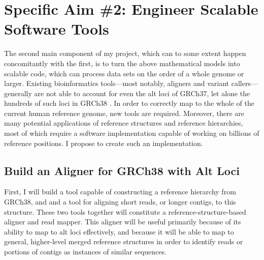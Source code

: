 \documentclass[11pt,proposal]{ucthesis}
\begin{document}
        
        
\section{Specific Aim \#2: Engineer Scalable Software Tools}
\label{sec:aim2}

The second main component of my project, which can to some extent happen concomitantly with the first, is to turn the above mathematical models into scalable code, which can process data sets on the order of a whole genome or larger. Existing bioinformatics tools---most notably, aligners and variant callers---generally are not able to account for even the alt loci of GRCh37, let alone the hundreds of such loci in GRCh38 \cite{church2014story}. In order to correctly map to the whole of the current human reference genome, new tools are required. Moreover, there are many potential applications of reference structures and reference hierarchies, most of which require a software implementation capable of working on billions of reference positions. I propose to create such an implementation.

\subsection{Build an Aligner for GRCh38 with Alt Loci}
\label{subsec:aim2aligner}

First, I will build a tool capable of constructing a reference hierarchy from GRCh38, and and a tool for aligning short reads, or longer contigs, to this structure. These two tools together will constitute a reference-structure-based aligner and read mapper. This aligner will be useful primarily because of its ability to map to alt loci effectively, and because it will be able to map to general, higher-level merged reference structures in order to identify reads or portions of contigs as instances of similar sequences.
\end{document}
